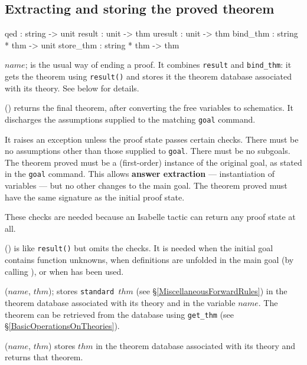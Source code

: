 \subsection{Extracting and storing the proved theorem}
\label{ExtractingAndStoringTheProvedTheorem}
\begin{ttbox} 
qed       : string -> unit
result    : unit -> thm
uresult   : unit -> thm
bind_thm  : string * thm -> unit
store_thm : string * thm -> thm
\end{ttbox}
\begin{ttdescription}
\item[\ttindexbold{qed} $name$;] is the usual way of ending a proof.
  It combines \texttt{result} and \texttt{bind_thm}: it gets the theorem
  using \texttt{result()} and stores it the theorem database associated
  with its theory.  See below for details.

\item[\ttindexbold{result}()]
  returns the final theorem, after converting the free variables to
  schematics.  It discharges the assumptions supplied to the matching 
  \texttt{goal} command.  

  It raises an exception unless the proof state passes certain checks.  There
  must be no assumptions other than those supplied to \texttt{goal}.  There
  must be no subgoals.  The theorem proved must be a (first-order) instance
  of the original goal, as stated in the \texttt{goal} command.  This allows
  {\bf answer extraction} --- instantiation of variables --- but no other
  changes to the main goal.  The theorem proved must have the same signature
  as the initial proof state.

  These checks are needed because an Isabelle tactic can return any proof
  state at all.

\item[\ttindexbold{uresult}()] is like \texttt{result()} but omits the checks.
  It is needed when the initial goal contains function unknowns, when
  definitions are unfolded in the main goal (by calling
  ), or when
   has been used.
  
\item[\ttindexbold{bind_thm} ($name$, $thm$);]
  stores \texttt{standard $thm$} (see \S\ref{MiscellaneousForwardRules})
  in the theorem database associated with its theory and in the {\ML}
  variable $name$.  The theorem can be retrieved from the database
  using \texttt{get_thm} (see \S\ref{BasicOperationsOnTheories}).
  
\item[\ttindexbold{store_thm} ($name$, $thm$)]
  stores $thm$ in the theorem database associated with its theory and
  returns that theorem.
\end{ttdescription}


